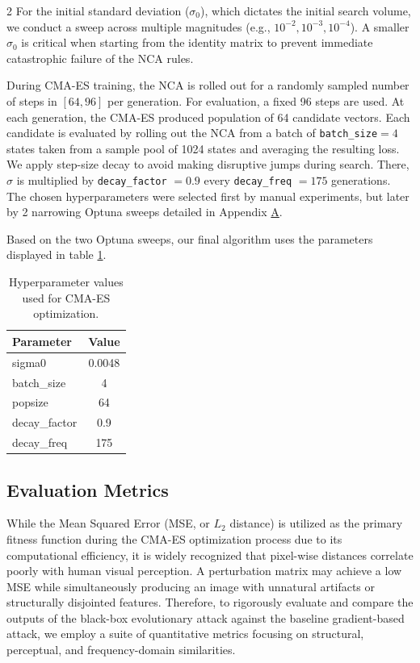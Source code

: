 \documentclass{article}
\begin{document}
\begin{multicols}{2}
For the initial standard deviation ($\sigma_0$), which dictates the initial search volume, we conduct a sweep across multiple magnitudes (e.g., $10^{-2}, 10^{-3}, 10^{-4}$). A smaller $\sigma_0$ is critical when starting from the identity matrix to prevent immediate catastrophic failure of the NCA rules.

During CMA-ES training, the NCA is rolled out for a randomly sampled number of steps in $[64, 96]$ per generation. For evaluation, a fixed 96 steps are used.
At each generation, the CMA-ES produced population of 64 candidate vectors. Each candidate is evaluated by rolling out the NCA from a batch of \texttt{batch\_size}$=4$ states taken from a sample pool of 1024 states and averaging the resulting loss. 
We apply step-size decay to avoid making disruptive jumps during search. There, $\sigma$ is multiplied by \texttt{decay\_factor} $= 0.9$ every \texttt{decay\_freq} $= 175$ generations. 
The chosen hyperparameters were selected first by manual experiments, but later by 2 narrowing Optuna sweeps detailed in Appendix \hyperref[appendix:a]{A}.

Based on the two Optuna sweeps, our final algorithm uses the parameters displayed in table \ref{tab:final_params}.

\begin{table}[H]
\centering
\begin{tabular}{lc}
\toprule
Parameter & Value \\
\midrule
sigma0 & 0.0048 \\
batch\_size & 4 \\
popsize & 64 \\
decay\_factor & 0.9 \\
decay\_freq & 175 \\
\bottomrule
\end{tabular}
\caption{Hyperparameter values used for CMA-ES optimization.}
\label{tab:final_params}
\end{table}




\subsection*{Evaluation Metrics}

While the Mean Squared Error (MSE, or $L_2$ distance) is utilized as the primary fitness function during the CMA-ES optimization process due to its computational efficiency, it is widely recognized that pixel-wise distances correlate poorly with human visual perception. A perturbation matrix may achieve a low MSE while simultaneously producing an image with unnatural artifacts or structurally disjointed features. Therefore, to rigorously evaluate and compare the outputs of the black-box evolutionary attack against the baseline gradient-based attack, we employ a suite of quantitative metrics focusing on structural, perceptual, and frequency-domain similarities.


\end{multicols}
\end{document}

